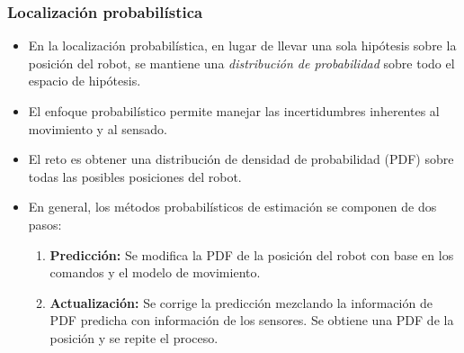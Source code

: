 \begin{frame}\frametitle{Localización probabilística}
  \begin{itemize}
  \item En la localización probabilística, en lugar de llevar una sola hipótesis sobre la posición del robot, se mantiene una \textit{distribución de probabilidad} sobre todo el espacio de hipótesis.
  \item El enfoque probabilístico permite manejar las incertidumbres inherentes al movimiento y al sensado.
  \item El reto es obtener una distribución de densidad de probabilidad (PDF) sobre todas las posibles posiciones del robot.
  \item En general, los métodos probabilísticos de estimación se componen de dos pasos:
    \begin{enumerate}
    \item \textbf{Predicción:} Se modifica la PDF de la posición del robot con base en los comandos y el modelo de movimiento.
    \item \textbf{Actualización:} Se corrige la predicción mezclando la información de PDF predicha con información de los sensores. Se obtiene una PDF de la posición y se repite el proceso. 
    \end{enumerate}
  \end{itemize}
  
\end{frame}

